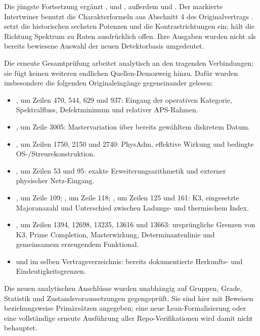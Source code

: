 Die jüngste Fortsetzung ergänzt ,
 und , außerdem
 und
.
Der markierte Intertwiner benutzt die Charakterformeln aus Abschnitt 4 des Originalvertrags .
 setzt die historischen sechsten Potenzen und die Kontrastrichtungen ein;  hält die Richtung Spektrum zu Raten ausdrücklich offen. Ihre Ausgaben wurden nicht als bereits bewiesene Auswahl der neuen Detektorbasis umgedeutet.

Die erneute Gesamtprüfung arbeitet analytisch an den tragenden Verbindungen; sie fügt keinen weiteren endlichen Quellen-Demozweig hinzu. Dafür wurden insbesondere die folgenden Originaleingänge gegeneinander gelesen:
\begin{itemize}
\item {}, um Zeilen 470, 544, 629 und 937: Eingang der operativen Kategorie, Spektralfluss, Defektminimum und relativer APS-Rahmen.
\item {}, um Zeile 3005: Mastervariation über bereits gewähltem diskretem Datum.
\item {}, um Zeilen 1750, 2150 und 2740: PhysAdm, effektive Wirkung und bedingte OS-/Streurekonstruktion.
\item {}, um Zeilen 53 und 95: exakte Erweiterungsarithmetik und externer physischer Netz-Eingang.
\item {}, um Zeile 109; , um Zeile 118; , um Zeilen 125 und 161: K3, eingesetzte Majoranazahl und Unterschied zwischen Ladungs- und thermischem Index.
\item {}, um Zeilen 1394, 12698, 13235, 13616 und 13663: ursprüngliche Grenzen von K3, Prime Completion, Masterwirkung, Determinantenlinie und gemeinsamem erzeugendem Funktional.
\item {} und  im selben Vertragsverzeichnis: bereits dokumentierte Herkunfts- und Eindeutigkeitsgrenzen.
\end{itemize}
Die neuen analytischen Anschlüsse wurden unabhängig auf Gruppen, Grade, Statistik und Zustandsvoraussetzungen gegengeprüft. Sie sind hier mit Beweisen beziehungsweise Primärsätzen angegeben; eine neue Lean-Formalisierung oder eine vollständige erneute Ausführung aller Repo-Verifikationen wird damit nicht behauptet.

